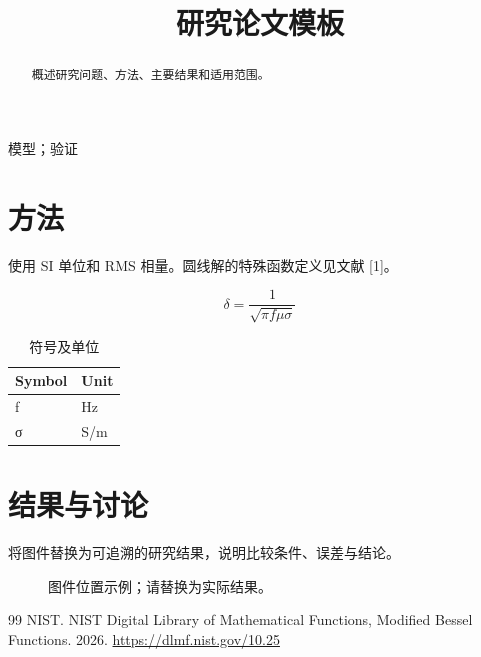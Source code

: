 \documentclass[conference]{IEEEtran}
\begin{document}
\title{研究论文模板}
\author{}
\maketitle
\begin{abstract}
概述研究问题、方法、主要结果和适用范围。
\end{abstract}
\begin{IEEEkeywords}
模型；验证
\end{IEEEkeywords}
\section{方法}
\hypertarget{chapter-01}{}
使用 SI 单位和 RMS 相量。圆线解的特殊函数定义见文献 [1]。

\begin{equation}\delta=\frac{1}{\sqrt{\pi f\mu\sigma}}\label{eq:skin}\end{equation}
\begin{table}[!htbp]
\centering
\caption{符号及单位}
\begingroup\footnotesize
\begin{tabularx}{\textwidth}{>{\raggedright\arraybackslash}X>{\raggedright\arraybackslash}X}
\toprule
Symbol & Unit\\
\midrule
f & Hz\\
σ & S/m\\
\bottomrule
\end{tabularx}\endgroup
\end{table}
\section{结果与讨论}
\hypertarget{chapter-02}{}
将图件替换为可追溯的研究结果，说明比较条件、误差与结论。

\renewcommand{\refname}{参考文献}
\begin{figure}[!htbp]\centering\fbox{\rule{0pt}{22mm}\rule{.8\linewidth}{0pt}}\caption{图件位置示例；请替换为实际结果。}\label{fig:example}\end{figure}
\begin{thebibliography}{99}
 NIST. NIST Digital Library of Mathematical Functions, Modified Bessel Functions. 2026. \url{https://dlmf.nist.gov/10.25}
\end{thebibliography}
\end{document}
